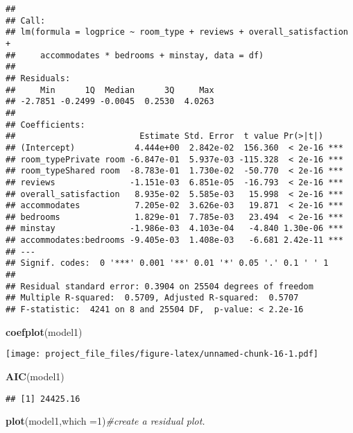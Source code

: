 \documentclass[]{article}
\newenvironment{Shaded}{\begin{snugshade}}{\end{snugshade}}
\newcommand{\KeywordTok}[1]{\textcolor[rgb]{0.13,0.29,0.53}{\textbf{#1}}}
\newcommand{\DataTypeTok}[1]{\textcolor[rgb]{0.13,0.29,0.53}{#1}}
\newcommand{\DecValTok}[1]{\textcolor[rgb]{0.00,0.00,0.81}{#1}}
\newcommand{\CommentTok}[1]{\textcolor[rgb]{0.56,0.35,0.01}{\textit{#1}}}
\newcommand{\NormalTok}[1]{#1}
\begin{document}
\begin{verbatim}
## 
## Call:
## lm(formula = logprice ~ room_type + reviews + overall_satisfaction + 
##     accommodates * bedrooms + minstay, data = df)
## 
## Residuals:
##     Min      1Q  Median      3Q     Max 
## -2.7851 -0.2499 -0.0045  0.2530  4.0263 
## 
## Coefficients:
##                         Estimate Std. Error  t value Pr(>|t|)    
## (Intercept)            4.444e+00  2.842e-02  156.360  < 2e-16 ***
## room_typePrivate room -6.847e-01  5.937e-03 -115.328  < 2e-16 ***
## room_typeShared room  -8.783e-01  1.730e-02  -50.770  < 2e-16 ***
## reviews               -1.151e-03  6.851e-05  -16.793  < 2e-16 ***
## overall_satisfaction   8.935e-02  5.585e-03   15.998  < 2e-16 ***
## accommodates           7.205e-02  3.626e-03   19.871  < 2e-16 ***
## bedrooms               1.829e-01  7.785e-03   23.494  < 2e-16 ***
## minstay               -1.986e-03  4.103e-04   -4.840 1.30e-06 ***
## accommodates:bedrooms -9.405e-03  1.408e-03   -6.681 2.42e-11 ***
## ---
## Signif. codes:  0 '***' 0.001 '**' 0.01 '*' 0.05 '.' 0.1 ' ' 1
## 
## Residual standard error: 0.3904 on 25504 degrees of freedom
## Multiple R-squared:  0.5709, Adjusted R-squared:  0.5707 
## F-statistic:  4241 on 8 and 25504 DF,  p-value: < 2.2e-16
\end{verbatim}

\begin{Shaded}
\begin{Highlighting}[]
\KeywordTok{coefplot}\NormalTok{(model1)}
\end{Highlighting}
\end{Shaded}

\texttt{[image: project\_file\_files/figure-latex/unnamed-chunk-16-1.pdf]}

\begin{Shaded}
\begin{Highlighting}[]
\KeywordTok{AIC}\NormalTok{(model1)}
\end{Highlighting}
\end{Shaded}

\begin{verbatim}
## [1] 24425.16
\end{verbatim}

\begin{Shaded}
\begin{Highlighting}[]
\KeywordTok{plot}\NormalTok{(model1,}\DataTypeTok{which =}\DecValTok{1}\NormalTok{)}\CommentTok{#create a residual plot.}
\end{Highlighting}
\end{Shaded}
\end{document}
